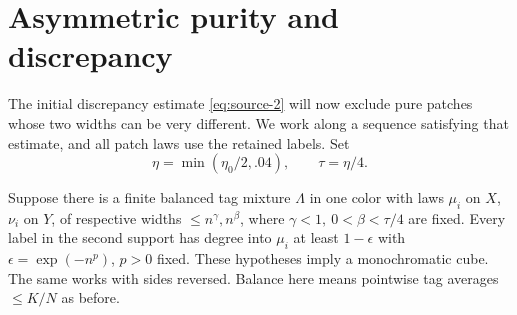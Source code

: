 \section{Asymmetric purity and discrepancy}
\label{sec:asymmetric-pure-patches-under-2}

The initial discrepancy estimate \eqref{eq:source-2} will now exclude pure patches whose two widths can be very different. We work along a sequence satisfying that estimate, and all patch laws use the retained labels. Set
\[
 \eta=\min(\eta_0/2,.04),\qquad \tau=\eta/4.
\]
\begin{lemma}\label{lem:asymmetric-purity}
Suppose there is a finite balanced tag mixture \(\Lambda\) in one color with laws \(\mu_i\) on \(X\), \(\nu_i\) on \(Y\), of respective widths \(\le n^\gamma,n^\beta\), where \(\gamma<1,\ 0<\beta<\tau/4\) are fixed. Every label in the second support has degree into \(\mu_i\) at least \(1-\epsilon\) with \(\epsilon=\exp(-n^{p})\), \(p>0\) fixed. These hypotheses imply a monochromatic cube. The same works with sides reversed. Balance here means pointwise tag averages \(\le K/N\) as before.
\end{lemma}

